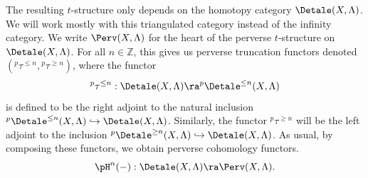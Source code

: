 \documentclass[letterpaper,11pt]{amsart}
\begin{document}
The resulting $t$-structure only depends on the homotopy category $\Detale(X,\Lambda)$. We will work mostly with this triangulated category instead of the infinity category. We write $\Perv(X,\Lambda)$ for the heart of the perverse $t$-structure on $\Detale(X,\Lambda)$. For all $n \in \mathbb{Z}$, this gives us perverse truncation functors denoted $(\phantom{}^{p}\tau^{\leq n},\phantom{}^{p}\tau^{\geq n})$, where the functor
\[ \phantom{}^{p}\tau^{\leq n}: \Detale(X,\Lambda) \ra \phantom{}^{p}\Detale^{\leq n}(X,\Lambda) \]
is defined to be the right adjoint to the natural inclusion $\phantom{}^{p}\Detale^{\leq n}(X,\Lambda) \hookrightarrow \Detale(X,\Lambda)$. Similarly, the functor $\phantom{}^{p}\tau^{\geq n}$ will be the left adjoint to the inclusion $\phantom{}^{p}\Detale^{\geq n}(X,\Lambda) \hookrightarrow \Detale(X,\Lambda)$.
As usual, by composing these functors, we obtain perverse cohomology functors. 
\[ \pH^{n}(-): \Detale(X,\Lambda) \ra \Perv(X,\Lambda).\]
\end{document}
